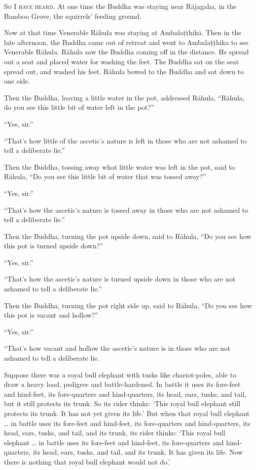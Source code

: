 \documentclass[12pt,openany]{book}%
\newcommand*{\scevam}[1]{\textsc{#1}}
\begin{document}
\scevam{So I have heard. }At one time the Buddha was staying near \textsanskrit{Rājagaha}, in the Bamboo Grove, the squirrels’ feeding ground. 

Now at that time Venerable \textsanskrit{Rāhula} was staying at \textsanskrit{Ambalaṭṭhikā}. Then in the late afternoon, the Buddha came out of retreat and went to \textsanskrit{Ambalaṭṭhika} to see Venerable \textsanskrit{Rāhula}. \textsanskrit{Rāhula} saw the Buddha coming off in the distance. He spread out a seat and placed water for washing the feet. The Buddha sat on the seat spread out, and washed his feet. \textsanskrit{Rāhula} bowed to the Buddha and sat down to one side. 

Then the Buddha, leaving a little water in the pot, addressed \textsanskrit{Rāhula}, “\textsanskrit{Rāhula}, do you see this little bit of water left in the pot?” 

“Yes, sir.” 

“That’s how little of the ascetic’s nature is left in those who are not ashamed to tell a deliberate lie.” 

Then the Buddha, tossing away what little water was left in the pot, said to \textsanskrit{Rāhula}, “Do you see this little bit of water that was tossed away?” 

“Yes, sir.” 

“That’s how the ascetic’s nature is tossed away in those who are not ashamed to tell a deliberate lie.” 

Then the Buddha, turning the pot upside down, said to \textsanskrit{Rāhula}, “Do you see how this pot is turned upside down?” 

“Yes, sir.” 

“That’s how the ascetic’s nature is turned upside down in those who are not ashamed to tell a deliberate lie.” 

Then the Buddha, turning the pot right side up, said to \textsanskrit{Rāhula}, “Do you see how this pot is vacant and hollow?” 

“Yes, sir.” 

“That’s how vacant and hollow the ascetic’s nature is in those who are not ashamed to tell a deliberate lie. 

Suppose there was a royal bull elephant with tusks like chariot-poles, able to draw a heavy load, pedigree and battle-hardened. In battle it uses its fore-feet and hind-feet, its fore-quarters and hind-quarters, its head, ears, tusks, and tail, but it still protects its trunk. So its rider thinks: ‘This royal bull elephant still protects its trunk. It has not yet given its life.’ But when that royal bull elephant … in battle uses its fore-feet and hind-feet, its fore-quarters and hind-quarters, its head, ears, tusks, and tail, and its trunk, its rider thinks: ‘This royal bull elephant … in battle uses its fore-feet and hind-feet, its fore-quarters and hind-quarters, its head, ears, tusks, and tail, and its trunk. It has given its life. Now there is nothing that royal bull elephant would not do.’ 
\end{document}
